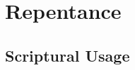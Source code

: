\section{Repentance}
	\label{REPENTANCE}
	





\subsection{Scriptural Usage} %
	\label{REPENTANCE-SCRIPTURES}

	
	
